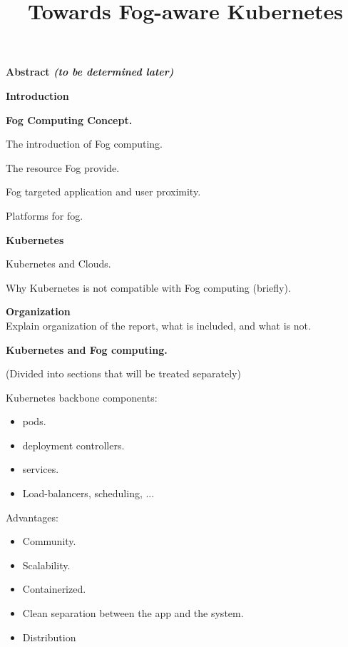 \documentclass[9pt]{article}
\title {Towards Fog-aware Kubernetes}
\date{}
\begin{document}
\maketitle

	\begin{outline}
		\item {\bf Abstract {\em (to be determined later)}}
		\item {\bf Introduction }
  		\begin{outline}
			\item {\bf Fog Computing Concept.} 
    		\begin{outline}
    			\item The introduction of Fog computing.
    			\item The resource Fog provide.
    			\item Fog targeted application and user proximity. 
    			\item Platforms for fog. 
    		\end{outline}
    		\item {\bf Kubernetes}
    		\begin{outline}
				\item Kubernetes and Clouds.
				\item Why Kubernetes is not compatible with Fog computing (briefly).      	
    	
    		\end{outline}
    	\item {\bf Organization } \\
      		Explain organization of the report, what is included, and what is not.
     \end{outline}
    		

	\item {\bf Kubernetes and Fog computing. }
	\begin{outline}
	\small (Divided into sections that will be treated separately)
		\item Kubernetes backbone components:
			\begin{itemize}
				\item pods.
				\item deployment controllers. 
				\item services.
				\item Load-balancers, scheduling, ... 
			\end{itemize}
		\item Advantages:
		\begin{itemize}
			\item Community.
			\item Scalability.
			\item Containerized.
			\item Clean separation between the app and the system.
			\item Distribution  
		\end{itemize}
		

\end{outline}
\end{outline}
\end{document}
